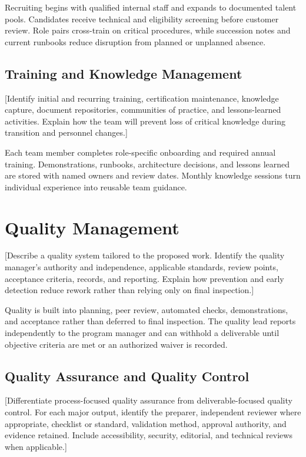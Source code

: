 Recruiting begins with qualified internal staff and expands to documented
talent pools. Candidates receive technical and eligibility screening before
customer review. Role pairs cross-train on critical procedures, while succession
notes and current runbooks reduce disruption from planned or unplanned absence.

\subsection{Training and Knowledge Management}
[Identify initial and recurring training, certification maintenance, knowledge
capture, document repositories, communities of practice, and lessons-learned
activities. Explain how the team will prevent loss of critical knowledge
during transition and personnel changes.]

Each team member completes role-specific onboarding and required annual
training. Demonstrations, runbooks, architecture decisions, and lessons learned
are stored with named owners and review dates. Monthly knowledge sessions turn
individual experience into reusable team guidance.

\section{Quality Management}
\label{sec:quality}
[Describe a quality system tailored to the proposed work. Identify the quality
manager's authority and independence, applicable standards, review points,
acceptance criteria, records, and reporting. Explain how prevention and early
detection reduce rework rather than relying only on final inspection.]

Quality is built into planning, peer review, automated checks, demonstrations,
and acceptance rather than deferred to final inspection. The quality lead
reports independently to the program manager and can withhold a deliverable
until objective criteria are met or an authorized waiver is recorded.

\subsection{Quality Assurance and Quality Control}
[Differentiate process-focused quality assurance from deliverable-focused
quality control. For each major output, identify the preparer, independent
reviewer where appropriate, checklist or standard, validation method, approval
authority, and evidence retained. Include accessibility, security, editorial,
and technical reviews when applicable.]


